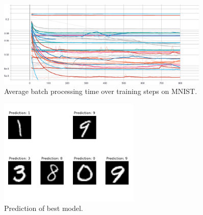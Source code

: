                 \begin{figure}[h]
                        \centering
                        \label{fig:mnist_batch}
                        \includegraphics[width=0.9\textwidth]{4_results/imgs/mnist/Average_batch_time}
                    \caption{Average batch processing time over training steps on MNIST.}
                \end{figure}


                \begin{figure}[H]
                        \centering
                        \label{fig:mnist_predit}
                        \includegraphics[width=0.6\textwidth]{4_results/imgs/mnist/predict}
                    \caption{Prediction of best model.}
                \end{figure}


\clearpage
\pagebreak
\newpage

